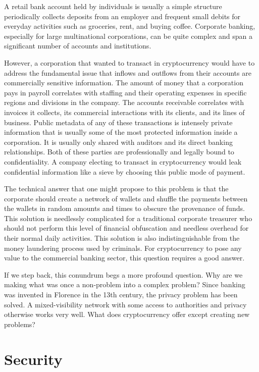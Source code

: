 A retail bank account held by individuals is usually a simple structure
periodically collects deposits from an employer and frequent small debits for
everyday activities such as groceries, rent, and buying coffee.  Corporate
banking, especially for large multinational corporations, can be quite complex
and span a significant number of accounts and institutions.

However, a corporation that wanted to transact in cryptocurrency would have to
address the fundamental issue that inflows and outflows from their accounts are
commercially sensitive information. The amount of money that a corporation pays
in payroll correlates with staffing and their operating expenses in specific
regions and divisions in the company. The accounts receivable correlates with
invoices it collects, its commercial interactions with its clients, and its
lines of business. Public metadata of any of these transactions is intensely
private information that is usually some of the most protected information
inside a corporation. It is usually only shared with auditors and its direct
banking relationships. Both of these parties are professionally and legally
bound to confidentiality. A company electing to transact in cryptocurrency would
leak confidential information like a sieve by choosing this public mode of
payment.

The technical answer that one might propose to this problem is that the
corporate should create a network of wallets and shuffle the payments between
the wallets in random amounts and times to obscure the provenance of funds. This
solution is needlessly complicated for a traditional corporate treasurer who
should not perform this level of financial obfuscation and needless overhead for
their normal daily activities. This solution is also indistinguishable from the
money laundering process used by criminals. For cryptocurrency to pose any value
to the commercial banking sector, this question requires a good answer.

If we step back, this conundrum begs a more profound question. Why are we making
what was once a non-problem into a complex problem? Since banking was invented
in Florence in the 13th century, the privacy problem has been solved. A
mixed-visibility network with some access to authorities and privacy otherwise
works very well. What does cryptocurrency offer except creating new problems?

\section{Security}

